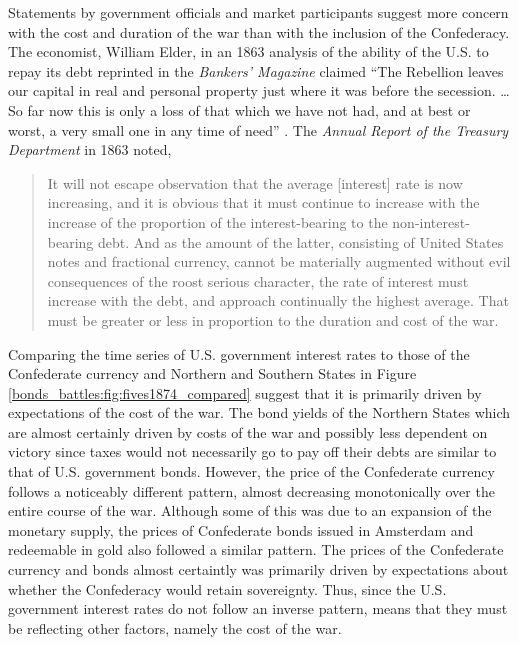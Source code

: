 Statements by government officials and market participants suggest more concern with the cost and duration of the war than with the inclusion of the Confederacy.
The economist, William Elder, in an 1863 analysis of the ability of the U.S. to repay its debt reprinted in the \textit{Bankers'  Magazine} claimed ``The Rebellion leaves our capital in real and personal property just where it was before the secession. \dots{} So far now this is only a loss of that which we have not had, and at best or worst, a very small one in any time of need'' \parencite[19]{Elder1863}.
The \textit{Annual Report of the Treasury Department} in 1863 noted,
\begin{quote}
It will not escape observation that the average [interest] rate is now increasing, and it is obvious that it must continue to increase with the increase of the proportion of the interest-bearing to the non-interest-bearing debt.
And as the amount of the latter, consisting of United States notes and fractional currency, cannot be materially augmented without evil consequences of the roost serious character, the rate of interest must increase with the debt, and approach continually the highest average.
That must be greater or less in proportion to the duration and cost of the war. \parencite[13]{Treasury1863}
\end{quote}

Comparing the time series of U.S. government interest rates to those of the Confederate currency and Northern and Southern States in Figure \ref{bonds_battles:fig:fives1874_compared} suggest that it is primarily driven by expectations of the cost of the war.
The bond yields of the Northern States which are almost certainly driven by costs of the war and possibly less dependent on victory since taxes would not necessarily go to pay off their debts are similar to that of U.S. government bonds.
However, the price of the Confederate currency follows a noticeably different pattern, almost decreasing monotonically over the entire course of the war.
Although some of this was due to an expansion of the monetary supply, the prices of Confederate bonds issued in Amsterdam and redeemable in gold also followed a similar pattern.
The prices of the Confederate currency and bonds almost certaintly was primarily driven by expectations about whether the Confederacy would retain sovereignty.
Thus, since the U.S. government interest rates do not follow an inverse pattern, means that they must be reflecting other factors, namely the cost of the war.

